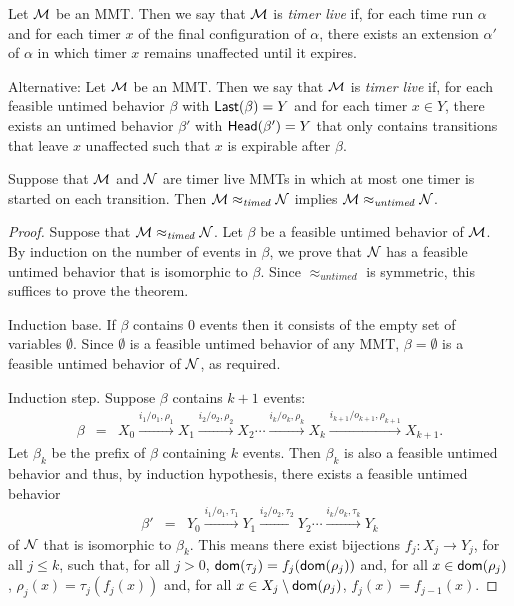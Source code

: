 Let ${\cal M}$ be an MMT. Then we say that ${\cal M}$ is \emph{timer live} if, for each time run $\alpha$ and for each timer $x$
of the final configuration of $\alpha$, there exists an extension $\alpha'$ of $\alpha$ in which timer $x$ 
remains unaffected until it expires.

Alternative: 
Let ${\cal M}$ be an MMT. Then we say that ${\cal M}$ is \emph{timer live} if, for each feasible untimed behavior $\beta$ with $\mathsf{Last}({\beta}) = Y$ and for each timer $x \in Y$, there exists an untimed behavior $\beta'$ with $\mathsf{Head}({\beta'}) = Y$ that only contains
transitions that leave $x$ unaffected such that $x$ is expirable after $\beta$.

\begin{theorem}
\label{timedimpliesuntimed}
Suppose that ${\cal M}$ and ${\cal N}$ are timer live MMTs in which at most one timer is started on each transition. Then
${\cal M} \approx_{\mathit{timed}} {\cal N}$
implies
${\cal M} \approx_{\mathit{untimed}} {\cal N}$.
\end{theorem}
\begin{proof}
Suppose that ${\cal M} \approx_{\mathit{timed}} {\cal N}$.
Let $\beta$ be a feasible untimed behavior of ${\cal M}$.
By induction on the number of events in $\beta$, we prove that ${\cal N}$ has a feasible untimed behavior that is isomorphic to $\beta$.
Since $\approx_{\mathit{untimed}}$ is symmetric, this suffices to prove the theorem.

Induction base. If $\beta$ contains $0$ events then it consists of the empty set of variables $\emptyset$.
Since $\emptyset$ is a feasible untimed behavior of any MMT, $\beta = \emptyset$ is a feasible untimed behavior of ${\cal N}$, as required.

Induction step. Suppose $\beta$ contains $k+1$ events:
\begin{eqnarray*}
\beta & = & X_0 \xrightarrow{i_1/o_1, \rho_1} X_1  \xrightarrow{i_2/o_2, \rho_2} X_2 \cdots \xrightarrow{i_k/o_k, \rho_k} X_{k}
 \xrightarrow{i_{k+1}/o_{k+1}, \rho_{k+1}} X_{k+1}.
\end{eqnarray*}
Let $\beta_k$ be the prefix of $\beta$ containing $k$ events. Then $\beta_k$ is also a feasible untimed behavior and thus, by
induction hypothesis, there exists a feasible untimed behavior
\begin{eqnarray*}
\beta' & = & Y_0 \xrightarrow{i_1/o_1, \tau_1} Y_1  \xrightarrow{i_2/o_2, \tau_2} Y_2 \cdots \xrightarrow{i_k/o_k, \tau_k} Y_{k}
\end{eqnarray*}
of ${\cal N}$ that is isomorphic to $\beta_k$. This means
there exist bijections $f_j : X_j \rightarrow Y_j$, for all $j \leq k$, such that, for all $j>0$, ${\textsf{dom}}(\tau_j) = f_j({\textsf{dom}}(\rho_j))$ and, for all $x \in{\textsf{dom}}(\rho_j)$,
$\rho_j(x) = \tau_j (f_j(x))$ and, for all $x \in X_j \setminus {\textsf{dom}}(\rho_j)$, $f_j(x) = f_{j-1}(x)$.
\end{proof}

